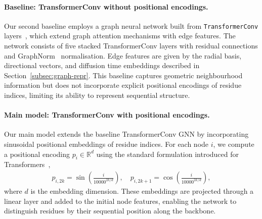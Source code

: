 \documentclass[a4paper,12pt]{article}
\begin{document}
\paragraph{Baseline: TransformerConv without positional encodings.}
Our second baseline employs a graph neural network built from \texttt{TransformerConv} layers~\cite{PyG1.0,PyG2.0}, which extend graph attention mechanisms with edge features. 
The network consists of five stacked TransformerConv layers with residual connections and GraphNorm~\cite{cai2021GraphNormPrincipledApproach} normalisation. 
Edge features are given by the radial basis, directional vectors, and diffusion time embeddings described in Section~\ref{subsec:graph-repr}. 
This baseline captures geometric neighbourhood information but does not incorporate explicit positional encodings of residue indices, limiting its ability to represent sequential structure.

\paragraph{Main model: TransformerConv with positional encodings.}
Our main model extends the baseline TransformerConv GNN by incorporating sinusoidal positional embeddings of residue indices. 
For each node \(i\), we compute a positional encoding \(p_i \in \mathbb{R}^d\) using the standard formulation introduced for Transformers~\cite{vaswaniAttentionAllYou2017}, 
\begin{align*}
    p_{i,2k} = \sin\!\left(\frac{i}{10000^{2k/d}}\right), \quad p_{i,2k+1} = \cos\!\left(\frac{i}{10000^{2k/d}}\right),
\end{align*}
where \(d\) is the embedding dimension. These embeddings are projected through a linear layer and added to the initial node features, enabling the network to distinguish residues by their sequential position along the backbone.
\end{document}
